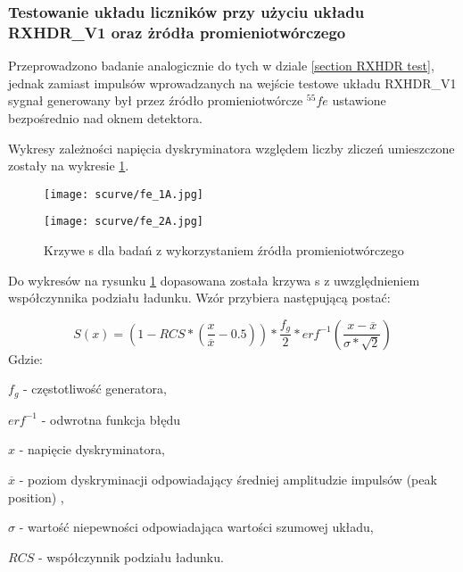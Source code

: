 \subsubsection{Testowanie układu liczników przy użyciu układu RXHDR\_V1 oraz żródła promieniotwórczego}
\label{section RXHDR fe}

Przeprowadzono badanie analogicznie do tych w dziale \ref{section RXHDR test}, jednak zamiast impulsów wprowadzanych na wejście testowe układu RXHDR\_V1 sygnał generowany był przez źródło promieniotwórcze ${}^{55}fe$ ustawione bezpośrednio nad oknem detektora. 

Wykresy zależności napięcia dyskryminatora względem liczby zliczeń umieszczone zostały na wykresie \ref{s curve fe}. 

\begin{figure}[]
        \centering
        \begin{multicols}{2}
                \texttt{[image: scurve/fe\_1A.jpg]} \par
                \texttt{[image: scurve/fe\_2A.jpg]} \par
                
        \end{multicols}
        \caption{Krzywe s dla badań z wykorzystaniem źródła promieniotwórczego}
        \label{s curve fe}
\end{figure}

Do wykresów na rysunku \ref{s curve fe} dopasowana została krzywa s z uwzględnieniem współczynnika podziału ładunku. Wzór przybiera następującą postać:

\begin{equation}
        \label{test eq}
        S(x) = (1-RCS * (\frac{x}{\overline{x}}-0.5)) * \frac{f_g}{2} * erf^{-1}(\frac{x-\overline{x}}{\sigma*\sqrt{2}})
\end{equation}
Gdzie:
\begin{description}
        \item $f_g$ - częstotliwość generatora,
        \item $erf^{-1}$ - odwrotna funkcja błędu
        \item $x$ - napięcie dyskryminatora,
        \item $\overline{x}$ - poziom dyskryminacji odpowiadający średniej amplitudzie impulsów (peak position) ,
        \item  $\sigma$ - wartość niepewności odpowiadająca wartości szumowej układu,
        \item $RCS$ -  współczynnik podziału ładunku.
\end{description}

